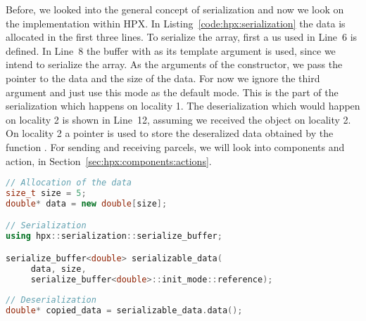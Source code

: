 Before, we looked into the general concept of serialization and now we look on the implementation within HPX. In Listing~\ref{code:hpx:serialization} the data is allocated in the first three lines. To serialize the  array, first a  us used in Line~6 is defined. In Line~8 the buffer  with  as its template argument is used, since we intend to serialize the  array. As the arguments of the constructor, we pass the pointer to the data and the size of the data. For now we ignore the third argument and just use this mode as the default mode. This is the part of the serialization which happens on locality 1. The deserialization which would happen on locality 2 is shown in Line~12, assuming we received the  object on locality 2. On locality 2 a pointer  is used to store the deseralized data obtained by the function . For sending and receiving parcels, we will look into components and action, in Section~\ref{sec:hpx:components:actions}.


\begin{lstlisting}[language=c++,caption={Serialization in HPX.\label{code:hpx:serialization}},float,floatplacement=htb]
// Allocation of the data
size_t size = 5;
double* data = new double[size];

// Serialization
using hpx::serialization::serialize_buffer;

serialize_buffer<double> serializable_data(
     data, size,
     serialize_buffer<double>::init_mode::reference);
     
// Deserialization
double* copied_data = serializable_data.data();
\end{lstlisting}


